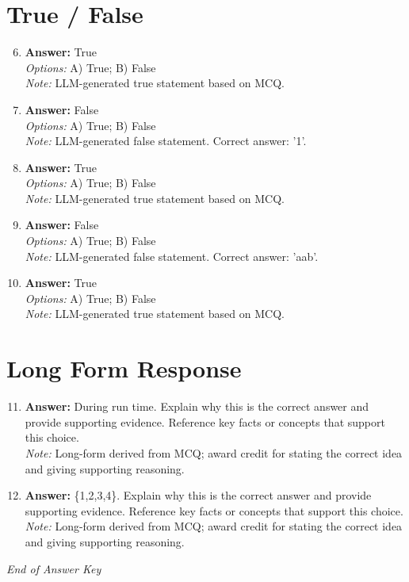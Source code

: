 \documentclass[12pt]{article}
\begin{document}
\section*{True / False}
\begin{enumerate}[label=\arabic*.]
\setcounter{enumi}{5}
\item \textbf{Answer:} True
\\ \textit{Options:} A) True; B) False
\\ \textit{Note:} LLM-generated true statement based on MCQ.
\item \textbf{Answer:} False
\\ \textit{Options:} A) True; B) False
\\ \textit{Note:} LLM-generated false statement. Correct answer: '1'.
\item \textbf{Answer:} True
\\ \textit{Options:} A) True; B) False
\\ \textit{Note:} LLM-generated true statement based on MCQ.
\item \textbf{Answer:} False
\\ \textit{Options:} A) True; B) False
\\ \textit{Note:} LLM-generated false statement. Correct answer: 'aab'.
\item \textbf{Answer:} True
\\ \textit{Options:} A) True; B) False
\\ \textit{Note:} LLM-generated true statement based on MCQ.
\end{enumerate}

\section*{Long Form Response}
\begin{enumerate}[label=\arabic*.]
\setcounter{enumi}{10}
\item \textbf{Answer:} During run time. Explain why this is the correct answer and provide supporting evidence. Reference key facts or concepts that support this choice.
\\ \textit{Note:} Long-form derived from MCQ; award credit for stating the correct idea and giving supporting reasoning.
\item \textbf{Answer:} \{1,2,3,4\}. Explain why this is the correct answer and provide supporting evidence. Reference key facts or concepts that support this choice.
\\ \textit{Note:} Long-form derived from MCQ; award credit for stating the correct idea and giving supporting reasoning.
\end{enumerate}

\vfill
\noindent\textit{End of Answer Key}
\end{document}

